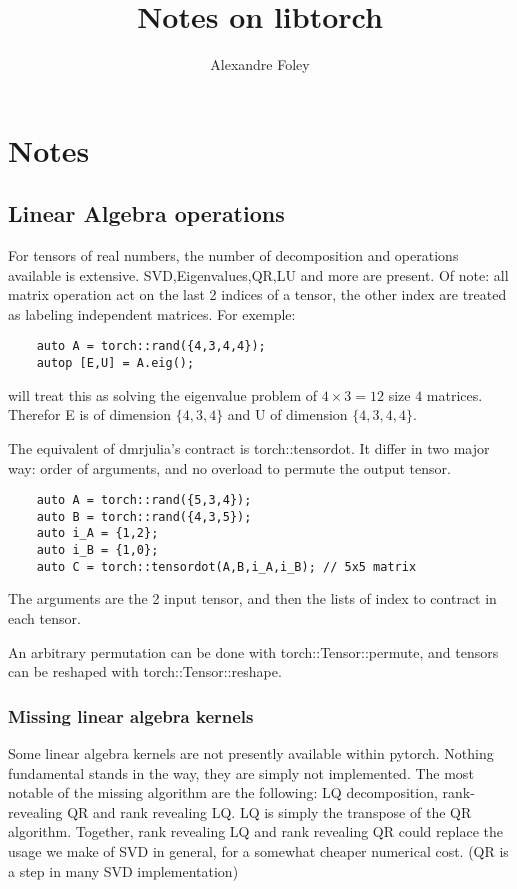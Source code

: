 \documentclass[15pt]{report}
\begin{document}
\title{Notes on libtorch}
\author{Alexandre Foley}

\maketitle

\tableofcontents
\chapter{Notes}
\section{Linear Algebra operations}
For tensors of real numbers, the number of decomposition and operations available is extensive. SVD,Eigenvalues,QR,LU and more are present. Of note: all matrix operation act on the last 2 indices of a tensor, the other index are treated as labeling independent matrices. For exemple:
\begin{verbatim}
    auto A = torch::rand({4,3,4,4});
    autop [E,U] = A.eig();
\end{verbatim}
will treat this as solving the eigenvalue problem of $4\times3=12$ size $4$ matrices. Therefor E is of dimension $\{4,3,4\}$ and U of dimension $\{ 4,3,4,4\}$.

The equivalent of dmrjulia's contract is torch::tensordot. It differ in two major way: order of arguments, and no overload to permute the output tensor.
\begin{verbatim}
    auto A = torch::rand({5,3,4});
    auto B = torch::rand({4,3,5});
    auto i_A = {1,2};
    auto i_B = {1,0};
    auto C = torch::tensordot(A,B,i_A,i_B); // 5x5 matrix
\end{verbatim}
The arguments are the 2 input tensor, and then the lists of index to contract in each tensor.

An arbitrary permutation can be done with torch::Tensor::permute, and tensors can be reshaped with torch::Tensor::reshape.
\subsection{Missing linear algebra kernels}

Some linear algebra kernels are not presently available within pytorch. Nothing fundamental stands in the way, they are simply not implemented.
The most notable of the missing algorithm are the following: LQ decomposition, rank-revealing QR and rank revealing LQ. LQ is simply the transpose of the QR algorithm.
Together, rank revealing LQ and rank revealing QR could replace the usage we make of SVD in general, for a somewhat cheaper numerical cost. (QR is a step in many SVD implementation)
\end{document}
